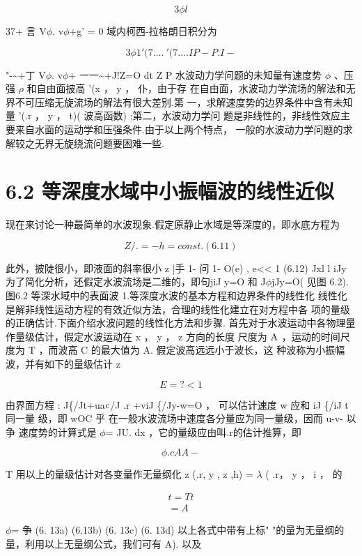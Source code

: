 \[3\phi l\]

37+ 言 V$\phi$. v$\phi$+g' = 0 域内柯西-拉格朗日积分为

\[3\phi 1 '(7.... ~ '(7.... I P - P. I -\]

"-\textasciitilde{}+丁 V$\phi$. v$\phi$+ 一一\textasciitilde{}+J!Z=O dt Z P 水波动力学问题的未知量有速度势 $\phi$ 、压强 $\rho$ 和自由面披高 '(x ， y ， 仆，由于存 在自由面，水波动力学流场的解法和无界不可压缩无旋流场的解法有很大差别.第 一，求解速度势的边界条件中含有未知量 '(.r ， y ， t)( 波高函数) ;第二，水波动力学问 题是非线性的，非线性效应主要来自水面的运动学和压强条件.由于以上两个特点， 一般的水波动力学问题的求解较之无界无旋绕流问题要困难一些.

\section*{6.2  等深度水域中小振幅波的线性近似}

现在来讨论一种最简单的水波现象.假定原静止水域是等深度的，即水底方程为

\[Z/. =- h = const. (6. 11)\]

此外，披陡很小，即液面的斜率很小 z |手 1- 问 1- O(e) , e<< 1 (6.12) Jxl l iJy 为了简化分析，还假定水波流场是二维的，即句jiJ y=O 和 J$\phi$jJy=O( 见图 6.2). 图6.2 等深水域中的表面波 1.等深度水波的基本方程和边界条件的线性化 线性化是解非线性运动方程的有效近似方法，合理的线性化建立在对方程中各 项的量级的正确估计.下面介绍水波问题的线性化方法和步骤. 首先对于水波运动中各物理量作量级估计，假定水波运动在 x ， y ， z 方向的长度 尺度为 ${\rm A}$ ，运动的时间尺度为 T ，而波高 C 的最大值为 A. 假定波高远远小于波长，这 种波称为小振幅波，并有如下的量级估计 z

\[E=?< 1\]

由界面方程 : J\{/Jt+ua${\rm c}$/J .r +viJ \{/Jy-w=O ， 可以估计速度 w 应和 iJ \{/iJ t 同一量 级，即 wOC 乎 在一般水波流场中速度各分量应为同一量级，因而 u-v- 以争 速度势的计算式是 $\phi$= JU. dx ，它的量级应由叫.r的估计推算，即

\[\phi  . c AA -\]

T 用以上的量级估计对各变量作无量纲化 z (.r, y , z ,h) = $\lambda$ ( .r， y ， i ， 的

\begin{gather*}
t = Tt\\
= A
\end{gather*}

$\phi$= 争 (6. 13a) (6.13b) (6. 13c) (6. 13d) 以上各式中带有上标" "的量为无量纲的量，利用以上无量纲公式，我们可有 A). 以及

